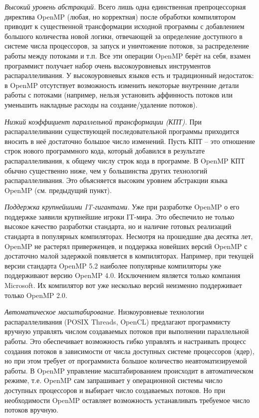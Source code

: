 \textit{Высокий уровень абстракций.} Всего лишь одна единственная препроцессорная директива OpenMP (любая, но корректная) после обработки компилятором приводит к существенной трансформации исходной программы с добавлением большого количества новой логики, отвечающей за определение доступного в системе числа процессоров, за запуск и уничтожение потоков, за распределение работы между потоками и т.п. Все эти операции OpenMP берёт на себя, взамен программист получает набор очень высокоуровневых инструментов распараллеливания. У высокоуровневых языков есть и традиционный недостаток: в OpenMP отсутствует возможность изменить некоторые внутренние детали работы с потоками (например, нельзя установить аффинность потоков или уменьшить накладные расходы на создание/удаление потоков).

\textit{Низкий коэффициент параллельной трансформации (КПТ).} При распараллеливании существующей последовательной программы приходится вносить в неё достаточно большое число изменений. Пусть КПТ -- это отношение строк нового программного кода, который добавился в результате распараллеливания, к общему числу строк кода в программе. В OpenMP КПТ обычно существенно ниже, чем у большинства других технологий распараллеливания. Это объясняется высоким уровнем абстракции языка OpenMP (см. предыдущий пункт). 

\textit{Поддержка крупнейшими  IT-гигантами.} Уже при разработке Open\-MP о его поддержке заявили крупнейшие игроки IT-мира. Это обеспечило не только высокое качество разработки стандарта, но и наличие готовых реализаций стандарта в популярных компиляторах. Несмотря на прошедшие два десятка лет, OpenMP не растерял приверженцев, и поддержка новейших версий OpenMP с достаточно малой задержкой появляется в компиляторах. Например, при текущей версии стандарта OpenMP 5.2 наиболее популярные компиляторы уже поддерживают версию OpenMP 4.0. Исключением является только компания Microsoft. Их компилятор вот уже несколько версий неизменно поддерживает только OpenMP 2.0. 

\textit{Автоматическое масштабирование.}  Низкоуровневые технологии распараллеливания (POSIX Threads, OpenCL) предлагают программисту вручную управлять числом создаваемых потоков при выполнении параллельной работы. Это обеспечивает возможность гибко управлять и настраивать процесс создания потоков в зависимости от числа доступных системе процессоров (ядер), но при этом требует от программиста большое количество неавтоматизируемой работы. В OpenMP управление масштабированием происходит в автоматическом режиме, т.е. OpenMP сам запрашивает у операционной системы число доступных процессоров и выбирает число создаваемых потоков. Но при необходимости OpenMP оставляет возможность устанавливать требуемое число потоков вручную.

